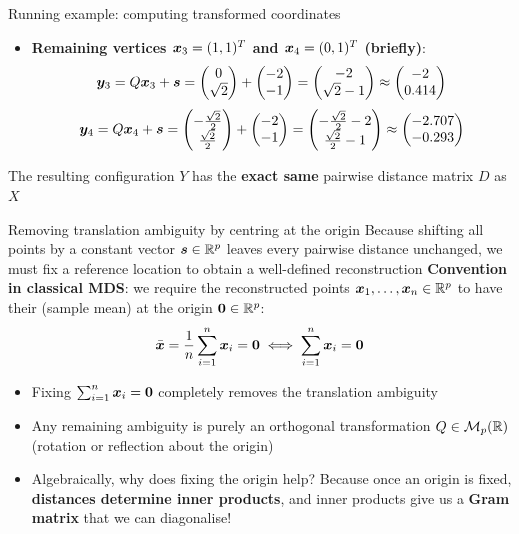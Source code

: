 \documentclass[aspectratio=169]{beamer}\usepackage[]{graphicx}\usepackage[]{xcolor}
\begin{document}
\begin{frame}{Running example: computing transformed coordinates}
\begin{itemize}
\[\]
\vfill
\item \textbf{Remaining vertices $\bm{x}_3 = (1,1)^T$ and $\bm{x}_4 = (0,1)^T$ (briefly)}:
\[
\bm{y}_3 = Q\bm{x}_3 + \bm{s} = \begin{pmatrix} 0 \\ \sqrt{2} \end{pmatrix} + \begin{pmatrix} -2 \\ -1 \end{pmatrix} = \begin{pmatrix} -2 \\ \sqrt{2}-1 \end{pmatrix} \approx \begin{pmatrix} -2 \\ 0.414 \end{pmatrix}
\]
\[
\bm{y}_4 = Q\bm{x}_4 + \bm{s} = \begin{pmatrix} -\frac{\sqrt{2}}{2} \\ \frac{\sqrt{2}}{2} \end{pmatrix} + \begin{pmatrix} -2 \\ -1 \end{pmatrix} = \begin{pmatrix} -\frac{\sqrt{2}}{2}-2 \\ \frac{\sqrt{2}}{2}-1 \end{pmatrix} \approx \begin{pmatrix} -2.707 \\ -0.293 \end{pmatrix}
\]
\end{itemize}
\vfill
The resulting configuration $Y$ has the \textbf{exact same} pairwise distance matrix $D$ as $X$
\end{frame}

\begin{frame}{Removing translation ambiguity by centring at the origin}
Because shifting all points by a constant vector $\bm{s}\in\mathbb{R}^p$ leaves every pairwise distance unchanged, we must fix a reference location to obtain a well-defined reconstruction
\vfill
\textbf{Convention in classical MDS}: we require the reconstructed points $\bm{x}_1,\ldots,\bm{x}_n\in\mathbb{R}^p$ to have their  (sample mean) at the origin $\b0\in\IR^p$:
\[
\bar{\bx} = \frac{1}{n}\sum_{i=1}^n \bx_i = \b0 \iff \sum_{i=1}^n \bx_i = \b0
\]
\vfill
\begin{itemize}
\item Fixing $\sum_{i=1}^n \bx_i = \b0$ completely removes the translation ambiguity
\item Any remaining ambiguity is purely an orthogonal transformation $Q\in\mathcal{M}_p(\mathbb{R})$ (rotation or reflection about the origin)
\item Algebraically, why does fixing the origin help? Because once an origin is fixed, \textbf{distances determine inner products}, and inner products give us a \textbf{Gram matrix} that we can diagonalise!
\end{itemize}
\end{frame}
\end{document}
